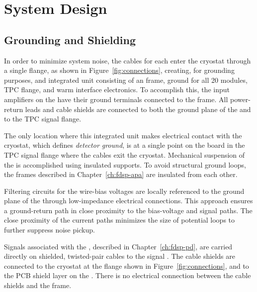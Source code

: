 \section{System Design}
\label{sec:fdsp-tpcelec-design}

\subsection{Grounding and Shielding}
\label{sec:fdsp-tpcelec-design-grounding}


In order to minimize system noise, the  cables for each  enter 
the cryostat through a single  flange, as shown in Figure~\ref{fig:connections}, creating, for grounding purposes, and integrated unit consisting of an  frame,  ground for all \num{20}  modules, TPC flange, and warm interface
electronics. To accomplish this,
the input amplifiers on the   have their ground terminals connected to the  frame. 
All power-return leads and cable shields are connected to both the ground plane of the  and to the TPC signal flange.

The only location where this integrated unit makes electrical contact with the 
cryostat, which defines \textit{detector ground}, is at a single point on the  \fdth board in the TPC signal flange where the 
cables exit the cryostat. Mechanical suspension of the  is accomplished using insulated supports. 
To avoid structural ground loops, the  frames described in Chapter~\ref{ch:fdsp-apa} are 
insulated from each other.

Filtering circuits for the  wire-bias voltages are locally referenced to the ground plane of the  through low-impedance electrical connections. This approach ensures a ground-return path in close proximity to the bias-voltage and signal paths. The close proximity of the current paths minimizes the size of potential loops to further suppress noise pickup.

Signals associated with the , described in Chapter~\ref{ch:fdsp-pd}, are carried directly on shielded, 
twisted-pair cables to the signal \fdth. The cable shields are connected to the cryostat 
at the  flange shown in Figure~\ref{fig:connections}, and to the PCB shield layer on the . There is no electrical connection between the cable shields and the  frame.

